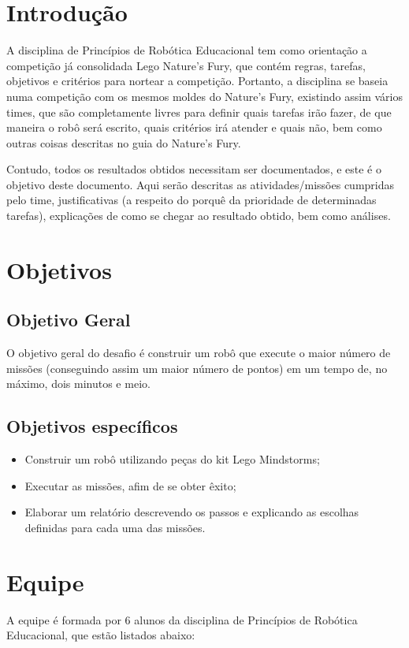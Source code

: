 \chapter{Introdução}
\label{introducao}
A disciplina de Princípios de Robótica Educacional tem como orientação a competição já consolidada Lego Nature’s Fury, que contém regras, tarefas, objetivos e critérios para nortear a competição. Portanto, a disciplina se baseia numa competição com os mesmos moldes do Nature’s Fury, existindo assim vários times, que são completamente livres para definir quais tarefas irão fazer, de que maneira o robô será escrito, quais critérios irá atender e quais não, bem como outras coisas descritas no guia do Nature’s Fury.

Contudo, todos os resultados obtidos necessitam ser documentados, e este é o objetivo deste documento. Aqui serão descritas as atividades/missões cumpridas pelo time, justificativas (a respeito do porquê da prioridade de determinadas tarefas), explicações de como se chegar ao resultado obtido, bem como análises.

\chapter{Objetivos}
\section{Objetivo Geral}
O objetivo geral do desafio é construir um robô que execute o maior número de missões (conseguindo assim um maior número de pontos) em um tempo de, no máximo, dois minutos e meio.
\section{Objetivos específicos}
\begin{itemize}
\item Construir um robô utilizando peças do kit Lego Mindstorms;
\item Executar as missões, afim de se obter êxito;
\item Elaborar um relatório descrevendo os passos e explicando as escolhas definidas para cada uma das missões.
\end{itemize}

\chapter{Equipe}
A equipe é formada por 6 alunos da disciplina de Princípios de Robótica Educacional, que estão listados abaixo:

